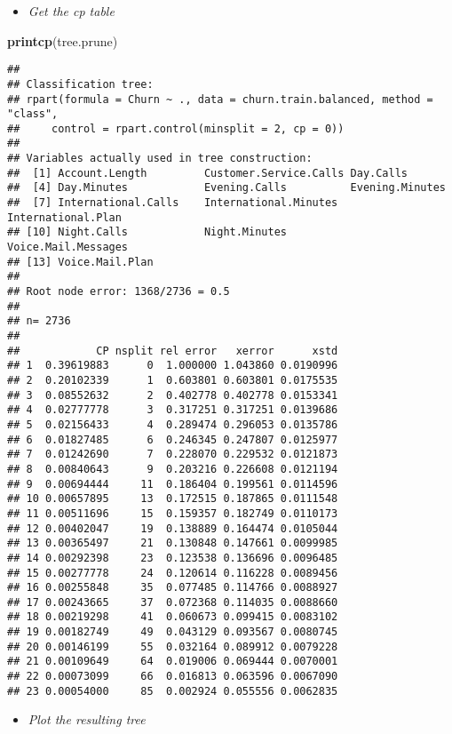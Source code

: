 \documentclass[]{article}
\newenvironment{Shaded}{\begin{snugshade}}{\end{snugshade}}
\newcommand{\KeywordTok}[1]{\textcolor[rgb]{0.13,0.29,0.53}{\textbf{#1}}}
\newcommand{\NormalTok}[1]{#1}
\providecommand{\tightlist}{%
  \setlength{\itemsep}{0pt}\setlength{\parskip}{0pt}}
\begin{document}
\begin{itemize}
\tightlist
\item
  \emph{Get the cp table}
\end{itemize}

\begin{Shaded}
\begin{Highlighting}[]
\KeywordTok{printcp}\NormalTok{(tree.prune)}
\end{Highlighting}
\end{Shaded}

\begin{verbatim}
## 
## Classification tree:
## rpart(formula = Churn ~ ., data = churn.train.balanced, method = "class", 
##     control = rpart.control(minsplit = 2, cp = 0))
## 
## Variables actually used in tree construction:
##  [1] Account.Length         Customer.Service.Calls Day.Calls             
##  [4] Day.Minutes            Evening.Calls          Evening.Minutes       
##  [7] International.Calls    International.Minutes  International.Plan    
## [10] Night.Calls            Night.Minutes          Voice.Mail.Messages   
## [13] Voice.Mail.Plan       
## 
## Root node error: 1368/2736 = 0.5
## 
## n= 2736 
## 
##            CP nsplit rel error   xerror      xstd
## 1  0.39619883      0  1.000000 1.043860 0.0190996
## 2  0.20102339      1  0.603801 0.603801 0.0175535
## 3  0.08552632      2  0.402778 0.402778 0.0153341
## 4  0.02777778      3  0.317251 0.317251 0.0139686
## 5  0.02156433      4  0.289474 0.296053 0.0135786
## 6  0.01827485      6  0.246345 0.247807 0.0125977
## 7  0.01242690      7  0.228070 0.229532 0.0121873
## 8  0.00840643      9  0.203216 0.226608 0.0121194
## 9  0.00694444     11  0.186404 0.199561 0.0114596
## 10 0.00657895     13  0.172515 0.187865 0.0111548
## 11 0.00511696     15  0.159357 0.182749 0.0110173
## 12 0.00402047     19  0.138889 0.164474 0.0105044
## 13 0.00365497     21  0.130848 0.147661 0.0099985
## 14 0.00292398     23  0.123538 0.136696 0.0096485
## 15 0.00277778     24  0.120614 0.116228 0.0089456
## 16 0.00255848     35  0.077485 0.114766 0.0088927
## 17 0.00243665     37  0.072368 0.114035 0.0088660
## 18 0.00219298     41  0.060673 0.099415 0.0083102
## 19 0.00182749     49  0.043129 0.093567 0.0080745
## 20 0.00146199     55  0.032164 0.089912 0.0079228
## 21 0.00109649     64  0.019006 0.069444 0.0070001
## 22 0.00073099     66  0.016813 0.063596 0.0067090
## 23 0.00054000     85  0.002924 0.055556 0.0062835
\end{verbatim}

\begin{itemize}
\tightlist
\item
  \emph{Plot the resulting tree}
\end{itemize}
\end{document}
